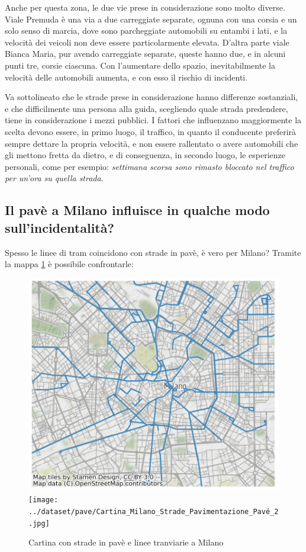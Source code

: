 \documentclass[a4paper]{report}
\newcommand{\quotestyle}[1]{\textit{#1}}
\begin{document}
Anche per questa zona, le due vie prese in considerazione sono molto diverse.
Viale Premuda è una via a due carreggiate separate, ognuna con una corsia e un solo senso 
di marcia, dove sono parcheggiate automobili su entambi i lati, e la velocità dei 
veicoli non deve essere particolarmente elevata.
D'altra parte viale Bianca Maria, pur avendo carreggiate separate, queste hanno due, 
e in alcuni punti tre, corsie ciascuna. 
Con l'aumentare dello spazio, inevitabilmente la velocità delle automobili aumenta, 
e con esso il rischio di incidenti.

Va sottolineato che le strade prese in considerazione hanno differenze sostanziali, e che 
difficilmente una persona alla guida, scegliendo quale strada predendere, tiene in 
considerazione i mezzi pubblici. 
I fattori che influenzano maggiormente la scelta devono essere, in primo luogo, 
il traffico, in quanto il conducente preferirà sempre dettare la propria velocità, e non 
essere rallentato o avere automobili che gli mettono fretta da dietro, 
e di conseguenza, in secondo luogo, le esperienze personali, come per esempio: 
\quotestyle{settimana scorsa sono rimasto bloccato nel traffico per un'ora su quella 
strada}.

\subsection{Il pavè a Milano influisce in qualche modo sull'incidentalità?}

Spesso le linee di tram coincidono con strade in pavè, è vero per Milano? 
Tramite la mappa \ref{fig:tram-pave-milano} è possibile confrontarle: 

\begin{figure}
    \includegraphics[width=0.48\linewidth]{../src/tram/tram_milano.png}
    \texttt{[image: ../dataset/pave/Cartina\_Milano\_Strade\_Pavimentazione\_Pavé\_2.jpg]}
    \caption{Cartina con strade in pavè e linee tranviarie a Milano}
    \label{fig:tram-pave-milano}
\end{figure}
\end{document}
